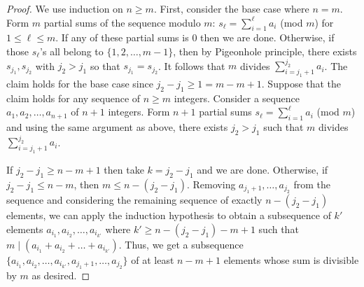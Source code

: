 \documentclass[12pt]{amsart}
\numberwithin{equation}{section}
\theoremstyle{definition}
\begin{document}
\begin{proof}
    We use induction on $n\ge m$. First, consider the base case where $n=m$.
    Form $m$ partial sums of the sequence modulo $m$: $s_\ell = \displaystyle \sum_{i=1}^\ell a_i $ (mod $m$) for $1\le \ell \le m$. If any of these partial sums is $0$ then we are done. Otherwise, if those $s_\ell$'s all belong to $\{1,2,\ldots ,m-1 \}$, then by Pigeonhole principle, there exists $s_{j_1}, s_{j_2}$ with $j_2>j_1$ so that $s_{j_1}= s_{j_2}$. It follows that $m$ divides $\displaystyle \sum_{i=j_1+1}^{j_2} a_i$. The claim holds for the base case since $j_2-j_1\ge 1 = m-m+1$. Suppose that the claim holds for any sequence of $n\ge m$ integers. Consider a sequence $a_1,a_2,\ldots ,a_{n+1}$ of $n+1$ integers. Form $n+1$ partial sums $s_\ell = \displaystyle \sum_{i=1}^\ell a_i $ (mod $m$) and using the same argument as above, there exists $j_2>j_1$ such that $m$ divides $\displaystyle \sum_{i=j_1+1}^{j_2} a_i$. 

    If $j_2-j_1 \ge n-m+1$ then take $k=j_2-j_1$ and we are done. Otherwise, if $j_2-j_1 \le n-m$, then $m \le n-(j_2-j_1)$. Removing $a_{j_1+1},\ldots,a_{j_2}$ from the sequence and considering the remaining sequence of exactly $n-(j_2-j_1)$ elements, we can apply the induction hypothesis to obtain a subsequence of $k'$ elements $a_{i_1},a_{i_2},\ldots ,a_{i_{k'}}$ where $k'\ge n-(j_2-j_1)-m+1$ such that $m \mid (a_{i_1}+a_{i_2}+\ldots +a_{i_{k'}})$. Thus, we get a subsequence $\{a_{i_1},a_{i_2},\ldots ,a_{i_{k'}}, a_{j_1+1},\ldots,a_{j_2}\}$ of at least $n-m+1$ elements whose sum is divisible by $m$ as desired.
\end{proof}
\end{document}
